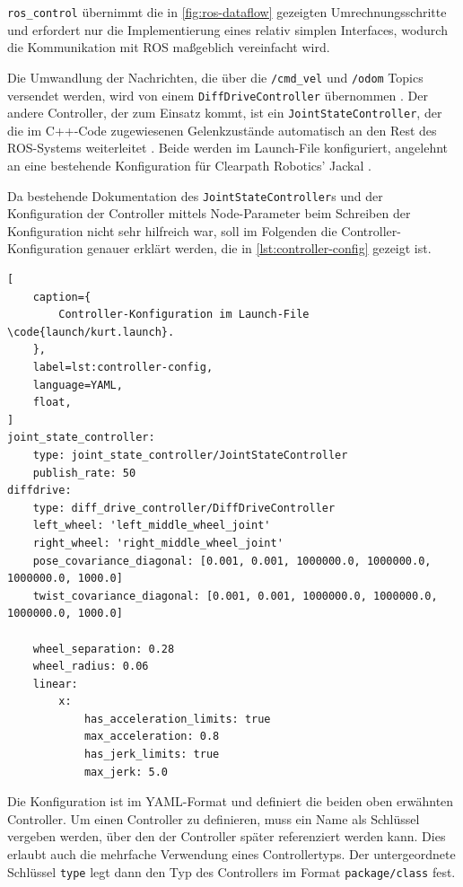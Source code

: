 \documentclass[german]{thesis_KBS}
\newcommand{\code}[1]{\texttt{#1}}  %
\begin{document}
\code{ros\_control} übernimmt die in \autoref{fig:ros-dataflow} gezeigten
Umrechnungsschritte und erfordert nur die Implementierung eines relativ simplen
Interfaces, wodurch die Kommunikation mit ROS maßgeblich vereinfacht wird.

Die Umwandlung der Nachrichten, die über die \code{/cmd\_vel} und \code{/odom}
Topics versendet werden, wird von einem \code{DiffDriveController} übernommen
\cite{ros-diff-drive-controller}. Der andere Controller, der zum Einsatz kommt,
ist ein \code{JointStateController}, der die im C++-Code zugewiesenen
Gelenkzustände automatisch an den Rest des ROS-Systems weiterleitet
\cite{ros-joint-state-controller}. Beide werden im Launch-File
 konfiguriert, angelehnt an eine bestehende
Konfiguration für Clearpath Robotics' Jackal \cite{ros-control-config-base}.

Da bestehende Dokumentation des \code{JointStateController}s und der
Konfiguration der Controller mittels Node-Parameter beim Schreiben der
Konfiguration nicht sehr hilfreich war, soll im Folgenden die
Controller-Konfiguration genauer erklärt werden, die in
\autoref{lst:controller-config} gezeigt ist.

\begin{lstlisting}[
    caption={
        Controller-Konfiguration im Launch-File \code{launch/kurt.launch}.
    },
    label=lst:controller-config,
    language=YAML,
    float,
]
joint_state_controller:
    type: joint_state_controller/JointStateController
    publish_rate: 50
diffdrive:
    type: diff_drive_controller/DiffDriveController
    left_wheel: 'left_middle_wheel_joint'
    right_wheel: 'right_middle_wheel_joint'
    pose_covariance_diagonal: [0.001, 0.001, 1000000.0, 1000000.0, 1000000.0, 1000.0]
    twist_covariance_diagonal: [0.001, 0.001, 1000000.0, 1000000.0, 1000000.0, 1000.0]

    wheel_separation: 0.28
    wheel_radius: 0.06
    linear:
        x:
            has_acceleration_limits: true
            max_acceleration: 0.8
            has_jerk_limits: true
            max_jerk: 5.0
\end{lstlisting}

Die Konfiguration ist im YAML-Format und definiert die beiden oben erwähnten
Controller. Um einen Controller zu definieren, muss ein Name als Schlüssel
vergeben werden, über den der Controller später referenziert werden kann. Dies
erlaubt auch die mehrfache Verwendung eines Controllertyps. Der untergeordnete
Schlüssel \code{type} legt dann den Typ des Controllers im Format
\code{package/class} fest.
\end{document}
